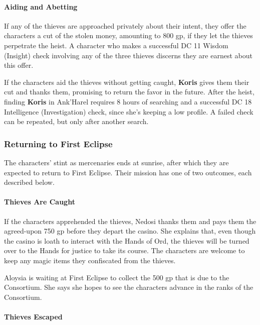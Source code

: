 \documentclass[a4paper, 11pt, bg=full, twocolumn, nooutline]{dndbook}
\begin{document}

\paragraph{Aiding and Abetting}

If any of the thieves are approached privately about their intent, they offer the characters a cut of the stolen money, amounting to 800 gp, if they let the thieves perpetrate the heist. A character who makes a successful DC 11 Wisdom (Insight) check involving any of the three thieves discerns they are earnest about this offer.

If the characters aid the thieves without getting caught, \textbf{Koris} gives them their cut and thanks them, promising to return the favor in the future. After the heist, finding \textbf{Koris} in Ank'Harel requires 8 hours of searching and a successful DC 18 Intelligence (Investigation) check, since she's keeping a low profile. A failed check can be repeated, but only after another search.

\subsubsection{Returning to First Eclipse}

The characters' stint as mercenaries ends at sunrise, after which they are expected to return to First Eclipse. Their mission has one of two outcomes, each described below.

\paragraph{Thieves Are Caught}

If the characters apprehended the thieves, Nedosi thanks them and pays them the agreed-upon 750 gp before they depart the casino. She explains that, even though the casino is loath to interact with the Hands of Ord, the thieves will be turned over to the Hands for justice to take its course. The characters are welcome to keep any magic items they confiscated from the thieves.

Aloysia is waiting at First Eclipse to collect the 500 gp that is due to the Consortium. She says she hopes to see the characters advance in the ranks of the Consortium.

\paragraph{Thieves Escaped}
\end{document}
